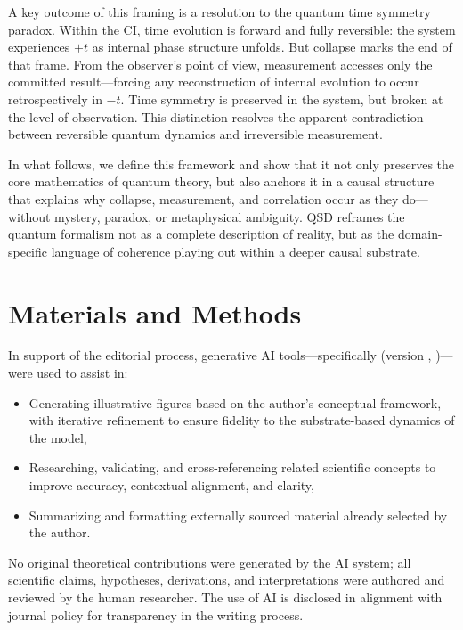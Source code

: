 \documentclass[entropy,article,submit,pdftex,moreauthors]{Definitions/mdpi}
\begin{document}
A key outcome of this framing is a resolution to the quantum time symmetry paradox. Within the CI, time evolution is forward and fully reversible: the system experiences \( +t \) as internal phase structure unfolds. But collapse marks the end of that frame. From the observer’s point of view, measurement accesses only the committed result—forcing any reconstruction of internal evolution to occur retrospectively in \( -t \). Time symmetry is preserved in the system, but broken at the level of observation. This distinction resolves the apparent contradiction between reversible quantum dynamics and irreversible measurement.

In what follows, we define this framework and show that it not only preserves the core mathematics of quantum theory, but also anchors it in a causal structure that explains why collapse, measurement, and correlation occur as they do—without mystery, paradox, or metaphysical ambiguity. QSD reframes the quantum formalism not as a complete description of reality, but as the domain-specific language of coherence playing out within a deeper causal substrate.



\section{Materials and Methods}
\qsdmethodstatement
In support of the editorial process, generative AI tools—specifically \qsdgptname (version \qsdgptver, \qsdgptyear)—were used to assist in:
\begin{itemize}
    \item Generating illustrative figures based on the author’s conceptual framework, with iterative refinement to ensure fidelity to the substrate-based dynamics of the model,
    \item Researching, validating, and cross-referencing related scientific concepts to improve accuracy, contextual alignment, and clarity,
    \item Summarizing and formatting externally sourced material already selected by the author.
\end{itemize}

No original theoretical contributions were generated by the AI system; all scientific claims, hypotheses, derivations, and interpretations were authored and reviewed by the human researcher. The use of AI is disclosed in alignment with journal policy for transparency in the writing process.
\end{document}
